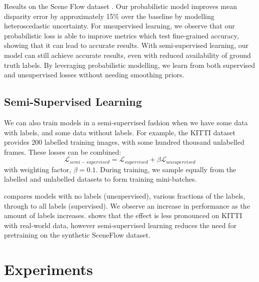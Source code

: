 \begin{table}[t]
\caption[Results on the Scene Flow dataset with uncertainty and unsupervised learning.]{Results on the Scene Flow dataset \citep{MIFDB16}. Our probabilistic model improves mean disparity error by approximately 15\% over the baseline by modelling heteroscedastic uncertainty. For unsupervised learning, we observe that our probabilistic loss is able to improve metrics which test fine-grained accuracy, showing that it can lead to accurate results. With semi-supervised learning, our model can still achieve accurate results, even with reduced availability of ground truth labels. By leveraging probabilistic modelling, we learn from both supervised and unsupervised losses without needing smoothing priors.}
\label{tbl:scene_flow2}
\end{table}

\subsection{Semi-Supervised Learning}

We can also train models in a semi-supervised fashion when we have some data with labels, and some data without labels. For example, the KITTI dataset provides 200 labelled training images, with some hundred thousand unlabelled frames. These losses can be combined:
\begin{equation}
\mathcal{L}_{semi-supervised} = \mathcal{L}_{supervised} + \beta \mathcal{L}_{unsupervised}
\label{eqn:semi_supervised}
\end{equation}
with weighting factor, $\beta=0.1$. During training, we sample equally from the labelled and unlabelled datasets to form training mini-batches. 

 compares models with no labels (unsupervised), various fractions of the labels, through to all labels (supervised). We observe an increase in performance as the amount of labels increases.  shows that the effect is less pronounced on KITTI with real-world data, however semi-supervised learning reduces the need for pretraining on the synthetic SceneFlow dataset.

\section{Experiments}
\label{sec:experiments}

